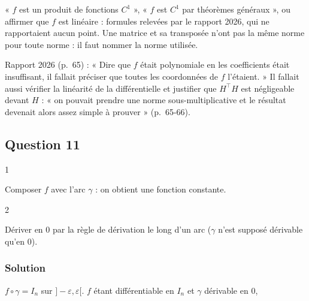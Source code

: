 \documentclass[11pt,a4paper]{article}
\newcommand{\equationajustee}[1]{%
  \sbox{\boiteequation}{$\displaystyle #1$}%
  \ifdim\wd\boiteequation>\linewidth
    \[\resizebox{\linewidth}{!}{\usebox{\boiteequation}}\]%
  \else
    \[#1\]%
  \fi}
\begin{document}
\begin{piege}

« \(f\) est un produit de fonctions \(C^1\) », « \(f\) est \(C^1\) par théorèmes généraux », ou affirmer que \(f\) est linéaire : formules relevées par le rapport 2026, qui ne rapportaient aucun point. Une matrice et sa transposée n'ont pas la même norme pour toute norme : il faut nommer la norme utilisée.

\end{piege}

\begin{jury}

Rapport 2026 (p.~65) : « Dire que \(f\) était polynomiale en les coefficients était insuffisant, il fallait préciser que toutes les coordonnées de \(f\) l'étaient. » Il fallait aussi vérifier la linéarité de la différentielle et justifier que \(H^\top H\) est négligeable devant \(H\) : « on pouvait prendre une norme sous-multiplicative et le résultat devenait alors assez simple à prouver » (p.~65-66).

\end{jury}

\hypertarget{question-11}{%
\subsection{Question 11}\label{question-11}}

\begin{indication}{1}

Composer \(f\) avec l'arc \(\gamma\) : on obtient une fonction constante.

\end{indication}

\begin{indication}{2}

Dériver en 0 par la règle de dérivation le long d'un arc (\(\gamma\) n'est supposé dérivable qu'en 0).

\end{indication}

\hypertarget{solution-10}{%
\subsubsection{Solution}\label{solution-10}}

\(f\circ\gamma=I_n\) sur \(]-\varepsilon,\varepsilon[\). \(f\) étant différentiable en \(I_n\) et \(\gamma\) dérivable en 0,

\equationajustee{\begin{aligned}0&=(f\circ\gamma)'(0)\\&=\mathrm{d}f(I_n)\cdot\gamma'(0)\\&=H+H^\top.\end{aligned}}
\end{document}
